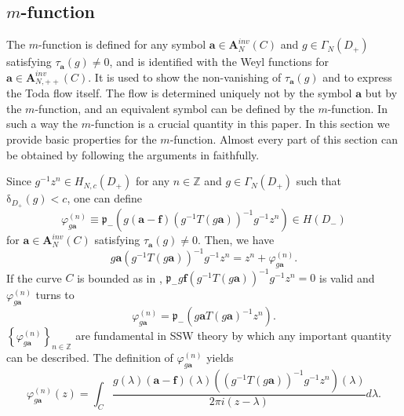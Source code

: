 \documentclass[a4paper]{article}%
\begin{document}
\subsection{$m$-function}

The $m$-function is defined for any symbol $\boldsymbol{a}\in\boldsymbol{A}%
_{N}^{inv}\left(  C\right)  $ and $g\in\Gamma_{N}\left(  D_{+}\right)  $
satisfying $\tau_{\boldsymbol{a}}\left(  g\right)  \neq0$, and is identified
with the Weyl functions for $\boldsymbol{a}\in\boldsymbol{A}_{N,++}%
^{inv}\left(  C\right)  $. It is used to show the non-vanishing of
$\tau_{\boldsymbol{a}}\left(  g\right)  $ and to express the Toda flow itself.
The flow is determined uniquely not by the symbol $\boldsymbol{a}$ but by the
$m$-function, and an equivalent symbol can be defined by the $m$-function. In
such a way the $m$-function is a crucial quantity in this paper. In this
section we provide basic properties for the $m$-function. Almost every part of
this section can be obtained by following the arguments in \cite{z} faithfully.

Since $g^{-1}z^{n}\in H_{N,c}\left(  D_{+}\right)  $ for any $n\in\mathbb{Z}$
and $g\in\Gamma_{N}\left(  D_{+}\right)  $ such that $\mathrm{\delta}_{D_{+}%
}\left(  g\right)  <c$, one can define
\begin{equation}
\varphi_{g\boldsymbol{a}}^{\left(  n\right)  }\equiv\mathfrak{p}_{-}\left(
g\left(  \boldsymbol{a}-\boldsymbol{f}\right)  \left(  g^{-1}T\left(
g\boldsymbol{a}\right)  \right)  ^{-1}g^{-1}z^{n}\right)  \in H\left(
D_{-}\right)  \label{2-18}%
\end{equation}
for $\boldsymbol{a}\in\boldsymbol{A}_{N}^{inv}\left(  C\right)  $ satisfying
$\tau_{\boldsymbol{a}}\left(  g\right)  \neq0$. Then, we have%
\begin{equation}
g\boldsymbol{a}\left(  g^{-1}T\left(  g\boldsymbol{a}\right)  \right)
^{-1}g^{-1}z^{n}=z^{n}+\varphi_{g\boldsymbol{a}}^{\left(  n\right)  }\text{.}
\label{2-19}%
\end{equation}
If the curve $C$ is bounded as in \cite{z}, $\mathfrak{p}_{-}g\boldsymbol{f}%
\left(  g^{-1}T\left(  g\boldsymbol{a}\right)  \right)  ^{-1}g^{-1}z^{n}=0$ is
valid and $\varphi_{g\boldsymbol{a}}^{\left(  n\right)  }$ turns to%
\[
\varphi_{g\boldsymbol{a}}^{\left(  n\right)  }=\mathfrak{p}_{-}\left(
g\boldsymbol{a}T\left(  g\boldsymbol{a}\right)  ^{-1}z^{n}\right)  \text{.}%
\]
$\left\{  \varphi_{g\boldsymbol{a}}^{\left(  n\right)  }\right\}
_{n\in\mathbb{Z}}$ are fundamental in SSW theory by which any important
quantity can be described. The definition of $\varphi_{g\boldsymbol{a}%
}^{\left(  n\right)  }$ yields%
\[
\varphi_{g\boldsymbol{a}}^{\left(  n\right)  }\left(  z\right)  =\int
_{C}\dfrac{g\left(  \lambda\right)  \left(  \boldsymbol{a}-\boldsymbol{f}%
\right)  \left(  \lambda\right)  \left(  \left(  g^{-1}T\left(
g\boldsymbol{a}\right)  \right)  ^{-1}g^{-1}z^{n}\right)  \left(
\lambda\right)  }{2\pi i\left(  z-\lambda\right)  }d\lambda\text{.}%
\]
\end{document}
